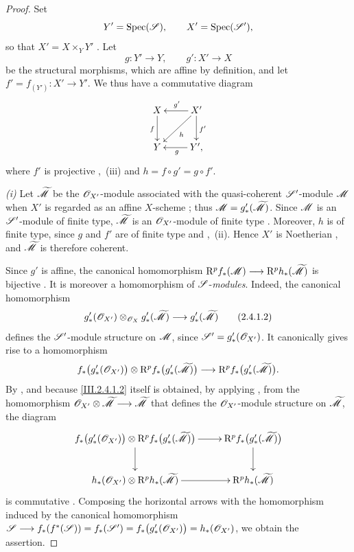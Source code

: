\begin{proof}
Set
\[
  Y'=\operatorname{Spec}(\mathscr{S}),\qquad X'=\operatorname{Spec}(\mathscr{S}'),
\]
so that $X'=X\times_Y Y'$ .
Let
\[
  g:Y'\longrightarrow Y,\qquad g':X'\longrightarrow X
\]
be the structural morphisms, which are affine by definition, and let $f'=f_{(Y')}:X'\longrightarrow Y'$.
We thus have a commutative diagram
\[
  \xymatrix{
    X\ar[d]_f &
    X'\ar[l]_{g'}\ar[d]^{f'}\ar[dl]^{h}\\
    Y &
    Y'\ar[l]^{g},
  }
\]
where $f'$ is projective ,~(iii) and $h=f\circ g'=g\circ f'$.

\emph{(i)} Let $\widetilde{\mathscr{M}}$ be the $\mathscr{O}_{X'}$-module associated with the quasi-coherent $\mathscr{S}'$-module $\mathscr{M}$ when $X'$ is regarded as an affine $X$-scheme ; thus $\mathscr{M}=g'_*(\widetilde{\mathscr{M}})$.
Since $\mathscr{M}$ is an $\mathscr{S}'$-module of finite type, $\widetilde{\mathscr{M}}$ is an $\mathscr{O}_{X'}$-module of finite type .
Moreover, $h$ is of finite type, since $g$ and $f'$ are of finite type  and ,~(ii).
Hence $X'$ is Noetherian , and $\widetilde{\mathscr{M}}$ is therefore coherent.

Since $g'$ is affine, the canonical homomorphism $\mathrm{R}^p f_*(\mathscr{M})
\longrightarrow
\mathrm{R}^p h_*(\widetilde{\mathscr{M}})$
is bijective .
It is moreover a homomorphism of $\mathscr{S}$-\emph{modules}.
Indeed, the canonical homomorphism
\[
\label{III.2.4.1.2}
  g'_*(\mathscr{O}_{X'})
  \otimes_{\mathscr{O}_X}
  g'_*(\widetilde{\mathscr{M}})
  \longrightarrow
  g'_*(\widetilde{\mathscr{M}})
  \tag{2.4.1.2}
\]
defines the $\mathscr{S}'$-module structure on $\mathscr{M}$, since $\mathscr{S}'=g'_*(\mathscr{O}_{X'})$.
It canonically gives rise to a homomorphism
\[
  f_*\bigl(g'_*(\mathscr{O}_{X'})\bigr)
  \otimes
  \mathrm{R}^p f_*\bigl(g'_*(\widetilde{\mathscr{M}})\bigr)
  \longrightarrow
  \mathrm{R}^p f_*\bigl(g'_*(\widetilde{\mathscr{M}})\bigr).
\]
By , and because \eqref{III.2.4.1.2} itself is obtained, by applying , from the homomorphism $\mathscr{O}_{X'}\otimes\widetilde{\mathscr{M}}
\longrightarrow\widetilde{\mathscr{M}}$
that defines the $\mathscr{O}_{X'}$-module structure on $\widetilde{\mathscr{M}}$, the diagram
\[
  \xymatrix{
    f_*\bigl(g'_*(\sh{O}_{X'})\bigr)
    \otimes\RR^p f_*\bigl(g'_*(\widetilde{\sh{M}})\bigr)
    \ar[r]\ar[d] &
    \RR^p f_*\bigl(g'_*(\widetilde{\sh{M}})\bigr)\ar[d]\\
    h_*(\sh{O}_{X'})
    \otimes\RR^p h_*(\widetilde{\sh{M}})
    \ar[r] &
    \RR^p h_*(\widetilde{\sh{M}})
  }
\]
is commutative .
Composing the horizontal arrows with the homomorphism induced by the canonical homomorphism $\mathscr{S}
\longrightarrow f_*(f^*(\mathscr{S}))
=f_*(\mathscr{S}')
=f_*\bigl(g'_*(\mathscr{O}_{X'})\bigr)
=h_*(\mathscr{O}_{X'})$,
we obtain the assertion.


\end{proof}
